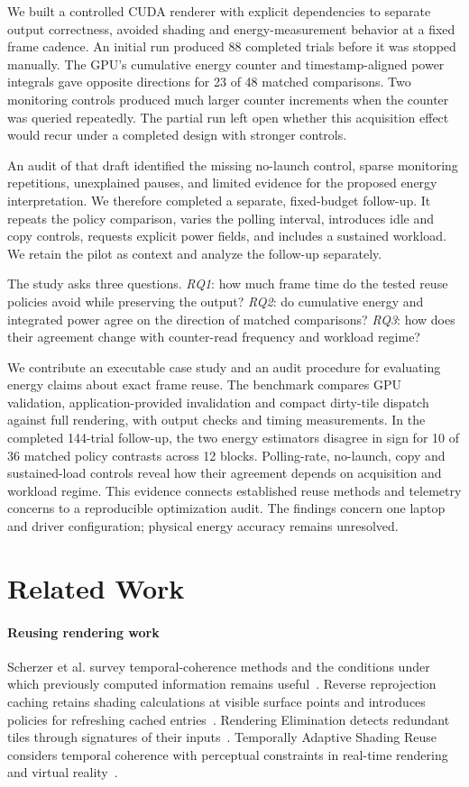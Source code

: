 \documentclass[10pt,conference]{IEEEtran}
\begin{document}
We built a controlled CUDA renderer with explicit dependencies to separate output correctness, avoided shading and energy-measurement behavior at a fixed frame cadence. An initial run produced 88 completed trials before it was stopped manually. The GPU's cumulative energy counter and timestamp-aligned power integrals gave opposite directions for 23 of 48 matched comparisons. Two monitoring controls produced much larger counter increments when the counter was queried repeatedly. The partial run left open whether this acquisition effect would recur under a completed design with stronger controls.

An audit of that draft identified the missing no-launch control, sparse monitoring repetitions, unexplained pauses, and limited evidence for the proposed energy interpretation. We therefore completed a separate, fixed-budget follow-up. It repeats the policy comparison, varies the polling interval, introduces idle and copy controls, requests explicit power fields, and includes a sustained workload. We retain the pilot as context and analyze the follow-up separately.

The study asks three questions. \emph{RQ1}: how much frame time do the tested reuse policies avoid while preserving the output? \emph{RQ2}: do cumulative energy and integrated power agree on the direction of matched comparisons? \emph{RQ3}: how does their agreement change with counter-read frequency and workload regime?

We contribute an executable case study and an audit procedure for evaluating energy claims about exact frame reuse. The benchmark compares GPU validation, application-provided invalidation and compact dirty-tile dispatch against full rendering, with output checks and timing measurements. In the completed 144-trial follow-up, the two energy estimators disagree in sign for 10 of 36 matched policy contrasts across 12 blocks. Polling-rate, no-launch, copy and sustained-load controls reveal how their agreement depends on acquisition and workload regime. This evidence connects established reuse methods and telemetry concerns to a reproducible optimization audit. The findings concern one laptop and driver configuration; physical energy accuracy remains unresolved.

\section{Related Work}
\paragraph{Reusing rendering work}
Scherzer et al. survey temporal-coherence methods and the conditions under which previously computed information remains useful~\cite{tc}. Reverse reprojection caching retains shading calculations at visible surface points and introduces policies for refreshing cached entries~\cite{reproject}. Rendering Elimination detects redundant tiles through signatures of their inputs~\cite{re}. Temporally Adaptive Shading Reuse considers temporal coherence with perceptual constraints in real-time rendering and virtual reality~\cite{tasr}.
\end{document}
